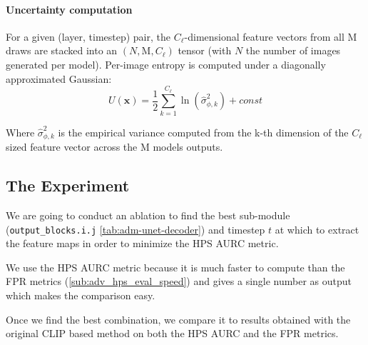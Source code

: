 
\paragraph{Uncertainty computation} For a given (layer, timestep) pair, the
$C_\ell$-dimensional feature vectors from all $\mathrm{M}$ draws are stacked into an
$(N, \mathrm{M}, C_\ell)$ tensor (with $N$ the number of images generated per model). Per-image entropy is computed under a diagonally approximated Gaussian:
\begin{equation}
    U(\mathbf{x}) = \frac{1}{2} \sum_{k=1}^{C_\ell} \ln\!\left(\hat{\sigma}^2_{\phi,k}
    \right) + const
    \label{eq:internal-entropy}
\end{equation}

Where $\hat{\sigma}^2_{\phi,k}$ is the empirical variance computed from the k-th dimension of the $C_\ell$ sized feature vector across the $\mathrm{M}$ models outputs.

\subsection{The Experiment}
\label{sub:internal-enc-abla-exp}

We are going to conduct an ablation to find the best sub-module (\texttt{output\_blocks.i.j} \autoref{tab:adm-unet-decoder}) and timestep $t$ at which to extract the feature maps in order to minimize the \acs{HPS} \acs{AURC} metric. 

We use the \acs{HPS} \acs{AURC} metric because it is much faster to compute than the \acs{FPR} metrics (\autoref{sub:adv_hps_eval_speed}) and gives a single number as output which makes the comparison easy. 

Once we find the best combination, we compare it to results obtained with the original \acs{CLIP} based method on both the \acs{HPS} \acs{AURC} and the \acs{FPR} metrics.

